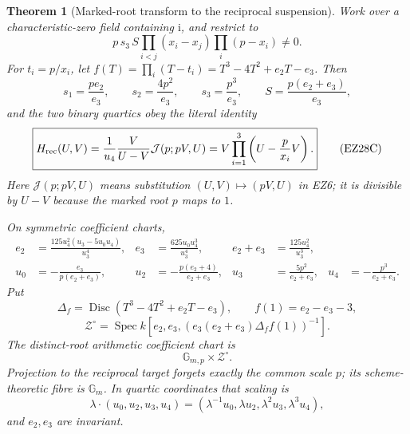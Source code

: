 \documentclass[11pt]{article}
\newtheorem{theorem}{Theorem}[section]
\theoremstyle{definition}\newtheorem{definition}[theorem]{Definition}
\theoremstyle{remark}\newtheorem{remark}[theorem]{Remark}
\newcommand{\Disc}{\operatorname{Disc}}
\newcommand{\ii}{\mathrm i}
\begin{document}
\begin{theorem}[Marked-root transform to the reciprocal suspension]
\label{thm:quartic-reciprocal-transform}
Work over a characteristic-zero field containing \(\ii\), and restrict to
\begin{equation}
 p\,s_3\,S
 \prod_{i<j}(x_i-x_j)\prod_i(p-x_i)\ne0.               \tag{EZ28A}
\end{equation}
For \(t_i=p/x_i\), let
\(f(T)=\prod_i(T-t_i)=T^3-4T^2+e_2T-e_3\).  Then
\begin{equation}
 s_1=\frac{pe_2}{e_3},\qquad
 s_2=\frac{4p^2}{e_3},\qquad
 s_3=\frac{p^3}{e_3},\qquad
 S=\frac{p(e_2+e_3)}{e_3},                             \tag{EZ28B}
\end{equation}
and the two binary quartics obey the literal identity
\begin{equation}
 \boxed{
 H_{\rm rec}(U,V)
 =\frac1{u_4}\frac{V}{U-V}\mathcal J(p;pV,U)
 =V\prod_{i=1}^3\left(U-\frac p{x_i}V\right).}         \tag{EZ28C}
\end{equation}
Here \(\mathcal J(p;pV,U)\) means substitution
\((U,V)\mapsto(pV,U)\) in EZ6; it is divisible by \(U-V\) because the marked
root \(p\) maps to \(1\).

On symmetric coefficient charts,
\begin{align}
 e_2&=\frac{125u_4^2(u_3-5u_0u_4)}{u_3^4},&
 e_3&=\frac{625u_0u_4^3}{u_3^4},&
 e_2+e_3&=\frac{125u_4^2}{u_3^3},                      \tag{EZ28D}\\
 u_0&=-\frac{e_3}{p(e_2+e_3)},&
 u_2&=-\frac{p(e_2+4)}{e_2+e_3},&
 u_3&=\frac{5p^2}{e_2+e_3},&
 u_4&=-\frac{p^3}{e_2+e_3}.                            \tag{EZ28E}
\end{align}
Put
\[
 \Delta_f=\Disc(T^3-4T^2+e_2T-e_3),\qquad
 f(1)=e_2-e_3-3,
\]
\[
 \mathscr Z^\circ=
 \operatorname{Spec}k[e_2,e_3,
   (e_3(e_2+e_3)\Delta_ff(1))^{-1}].
\]
The distinct-root arithmetic coefficient chart is
\begin{equation}
 \boxed{\mathbb G_{m,p}\times\mathscr Z^\circ.}         \tag{EZ28F}
\end{equation}
Projection to the reciprocal target forgets exactly the common scale \(p\);
its scheme-theoretic fibre is \(\mathbb G_m\).  In quartic coordinates that
scaling is
\begin{equation}
 \lambda\cdot(u_0,u_2,u_3,u_4)
 =(\lambda^{-1}u_0,\lambda u_2,\lambda^2u_3,\lambda^3u_4), \tag{EZ28G}
\end{equation}
and \(e_2,e_3\) are invariant.


\end{theorem}
\end{document}
